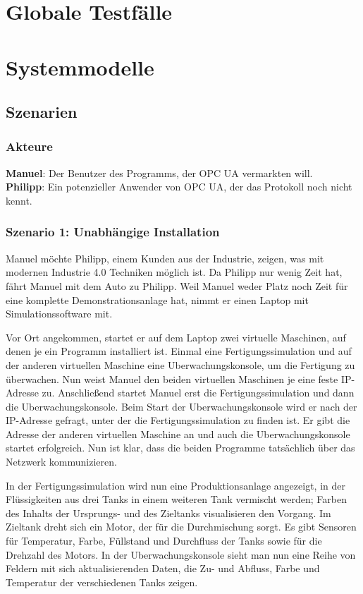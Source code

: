 \documentclass[parskip=full]{scrartcl}
\begin{document}
\pagebreak
\section{Globale Testfälle}
\Blindtext[1]

\pagebreak
\section{Systemmodelle}
\subsection{Szenarien}
\subsubsection*{Akteure}
\textbf{Manuel}: Der Benutzer des Programms, der \gls{OPC UA} vermarkten will.\\
\textbf{Philipp}: Ein potenzieller Anwender von \gls{OPC UA}, der das Protokoll noch nicht kennt.

\subsubsection{Szenario 1: Unabhängige Installation}
Manuel möchte Philipp, einem Kunden aus der Industrie, zeigen, was mit modernen Industrie 4.0 Techniken möglich ist.
Da Philipp nur wenig Zeit hat, fährt Manuel mit dem Auto zu Philipp. Weil Manuel weder Platz 
noch Zeit für eine komplette Demonstrationsanlage hat, nimmt er einen Laptop mit Simulationssoftware mit.

Vor Ort angekommen, startet er auf dem Laptop zwei virtuelle Maschinen, auf denen je ein Programm installiert ist. 
Einmal eine \gls{Fertigungssimulation} und auf der anderen virtuellen Maschine eine \gls{Uberwachungskonsole}, um die Fertigung zu überwachen.
Nun weist Manuel den beiden virtuellen Maschinen je eine feste IP-Adresse zu.
Anschlie{\ss}end startet Manuel erst die \gls{Fertigungssimulation} und dann die \gls{Uberwachungskonsole}.
Beim Start der \gls{Uberwachungskonsole} wird er nach der IP-Adresse gefragt, unter der die \gls{Fertigungssimulation} zu finden ist. 
Er gibt die Adresse der anderen virtuellen Maschine an und auch die \gls{Uberwachungskonsole} startet erfolgreich. 
Nun ist klar, dass die beiden Programme tatsächlich über das Netzwerk kommunizieren.

In der \gls{Fertigungssimulation} wird nun eine \gls{Produktionsanlage} angezeigt, in der Flüssigkeiten aus drei Tanks
in einem weiteren Tank vermischt werden; Farben des Inhalts der Ursprungs- und des Zieltanks visualisieren den Vorgang. 
Im Zieltank dreht sich ein Motor, der für die Durchmischung sorgt.
Es gibt Sensoren für Temperatur, Farbe, Füllstand und Durchfluss der Tanks sowie für die Drehzahl des Motors.
In der \gls{Uberwachungskonsole} sieht man nun eine Reihe von Feldern mit sich aktualisierenden Daten,
die Zu- und Abfluss, Farbe und Temperatur der verschiedenen Tanks zeigen.
\end{document}
